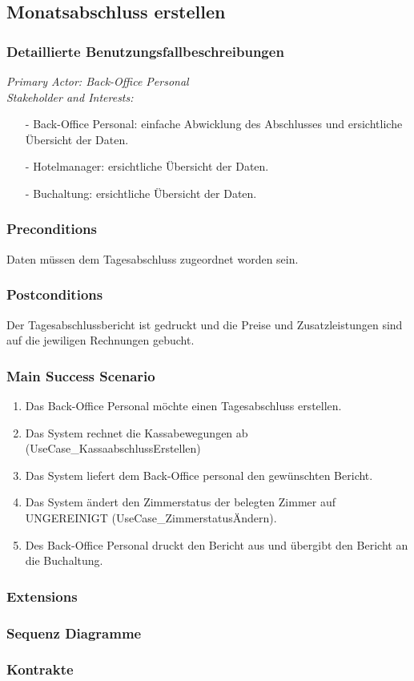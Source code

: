 \documentclass[./detailed_overview_usecases.tex]{subfiles}
\begin{document}
    \subsection{Monatsabschluss erstellen}
    \subsubsection{Detaillierte Benutzungsfallbeschreibungen}
    \textit{Primary Actor: Back-Office Personal}
    \\
    \textit{Stakeholder and Interests:}
    \begin{itemize}
        \item[-] Back-Office Personal: einfache Abwicklung des Abschlusses und ersichtliche Übersicht der Daten.
        \item[-] Hotelmanager: ersichtliche Übersicht der Daten.
        \item[-] Buchaltung: ersichtliche Übersicht der Daten.
    \end{itemize}

    \subsubsection*{Preconditions}
    Daten müssen dem Tagesabschluss zugeordnet worden sein.
    \subsubsection*{Postconditions}
    Der Tagesabschlussbericht ist gedruckt und die Preise und Zusatzleistungen sind auf die jewiligen Rechnungen gebucht.

    \subsubsection*{Main Success Scenario}
    \begin{enumerate}
        \item Das Back-Office Personal möchte einen Tagesabschluss erstellen.
        \item Das System rechnet die Kassabewegungen ab (UseCase_KassaabschlussErstellen)
        \item Das System liefert dem Back-Office personal den gewünschten Bericht.
        \item Das System ändert den Zimmerstatus der belegten Zimmer auf UNGEREINIGT (UseCase_ZimmerstatusÄndern).
        \item Des Back-Office Personal druckt den Bericht aus und übergibt den Bericht an die Buchaltung.
    \end{enumerate}

    \subsubsection*{Extensions}
    \subsubsection{Sequenz Diagramme}
    \subsubsection{Kontrakte}
\end{document}
